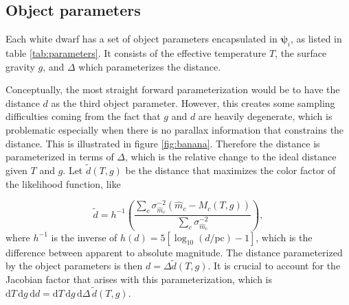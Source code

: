 \documentclass[fleqn,usenatbib]{mnras}
\newcommand{\objp}{\boldsymbol{\psi}}
\newcommand{\Teff}{T}
\newcommand{\logg}{g}
\newcommand{\de}{\text{d}}
\begin{document}
\subsection{Object parameters}\label{sec:objectparams}

Each white dwarf has a set of object parameters encapsulated in $\objp_i$, as listed in table \ref{tab:parameters}. It consists of the effective temperature $\Teff$, the surface gravity $\logg$, and $\Delta$ which parameterizes the distance.

Conceptually, the most straight forward parameterization would be to have the distance $d$ as the third object parameter. However, this creates some sampling difficulties coming from the fact that $\logg$ and $d$ are heavily degenerate, which is problematic especially when there is no parallax information that constrains the distance. This is illustrated in figure \ref{fig:banana}. Therefore the distance is parameterized in terms of $\Delta$, which is the relative change to the ideal distance given $\Teff$ and $\logg$. Let $\tilde{d}(\Teff,\logg)$ be the distance that maximizes the color factor of the likelihood function, like

\begin{equation}
	\tilde{d} = 
    h^{-1}\left( \frac{\sum_c \sigma_{\hat{m}_c}^{-2} (\hat{m}_c-M_c(\Teff,\logg))}{\sum_c \sigma_{\hat{m}_c}^{-2}} \right),
\end{equation}
where $h^{-1}$ is the inverse of $h(d)=5[\log_{10}(d/\text{pc})-1]$, which is the difference between apparent to absolute magnitude. The distance parameterized by the object parameters is then $d=\Delta\tilde{d}(\Teff,\logg)$. It is crucial to account for the Jacobian factor that arises with this parameterization, which is $\de \Teff\, \de \logg\, \de d = \de \Teff\, \de \logg\, \de \Delta\, \tilde{d}(\Teff,\logg)$.
\end{document}
